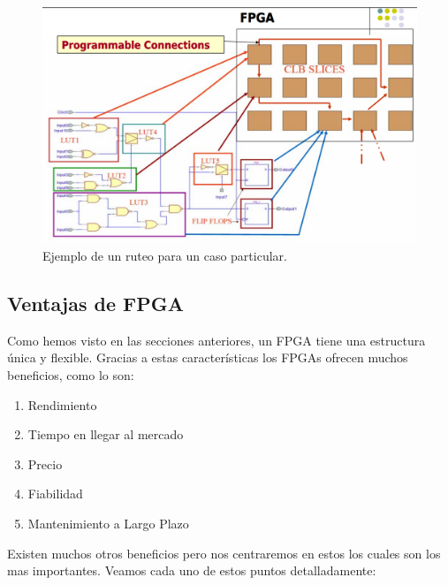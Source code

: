 \documentclass[twoside,spanish,ESP,MSc]{plantillaLabUPV}
\theoremstyle{definition}
\newcommand{\f}{FPGA }
\newcommand{\fs}{FPGAs }
\begin{document}
\begin{itemize}
\begin{figure}[h]
\centering
\includegraphics[scale=0.35]{ima/route.png}
\caption{Ejemplo de un ruteo para un caso particular.%
\label{route}}
\end{figure}

\end{itemize}

\subsection{Ventajas de \f}
Como hemos visto en las secciones anteriores, un \f tiene una estructura única y flexible. Gracias a estas características los \fs ofrecen muchos beneficios, como lo son:

\begin{enumerate}
\item Rendimiento
\item Tiempo en llegar al mercado
\item Precio
\item Fiabilidad
\item Mantenimiento a Largo Plazo\\
\end{enumerate}

Existen muchos otros beneficios pero nos centraremos en estos los cuales son los mas importantes. Veamos cada uno de estos puntos detalladamente:\\
\end{document}
